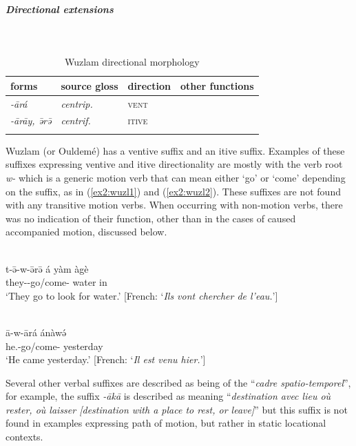\subparagraph{Directional extensions}~

\begin{table}[H]
	\caption{Wuzlam directional morphology}
	\label{tab:wuzl}
	\begin{tabular}{llll} %
		\lsptoprule
		forms & source gloss & direction  & other functions  \\ %
		\midrule
		\textit{-ārá}  &  \textit{centrip.}  &  \textsc{vent}  &    \\
		\textit{-ārāy, ə̄rə̄}  &  \textit{centrif.}  & \textsc{itive}   &    \\
		\lspbottomrule
	\end{tabular}
\end{table} 

Wuzlam (or Ouldemé) has a ventive suffix and an itive suffix. Examples of these suffixes expressing ventive and itive directionality are mostly with the verb root \textit{w-} which is a generic motion verb that can mean either `go' or `come' depending on the suffix, as in (\ref{ex2:wuzl1}) and (\ref{ex2:wuzl2}). These suffixes are not found with any transitive motion verbs. When occurring with non-motion verbs, there was no indication of their function, other than in the cases of caused accompanied motion, discussed below. 

\ea\label{ex2:wuzl1}
 \\
\gll t-ə̄-w-ə̄rə̄ á yàm àgè \\
they--go/come-  water in \\
\glt `They go to look for water.' [French: `\textit{Ils vont chercher de l'eau.}']

\ex\label{ex2:wuzl2}
 \\
\gll ā-w-ārá ánàwə́ \\
he.-go/come- yesterday \\
\glt `He came yesterday.' [French: `\textit{Il est venu hier.}']
\z	

Several other verbal suffixes are described as being of the ``\textit{cadre spatio-temporel}'', for example, the suffix \textit{-ākā} is described as meaning ``\textit{destination avec lieu où rester, où laisser [destination with a place to rest, or leave]}'' \citep[54]{colombelLangueOuldemeNordCameroun2005} but this suffix is not found in examples expressing path of motion, but rather in static locational contexts. 

